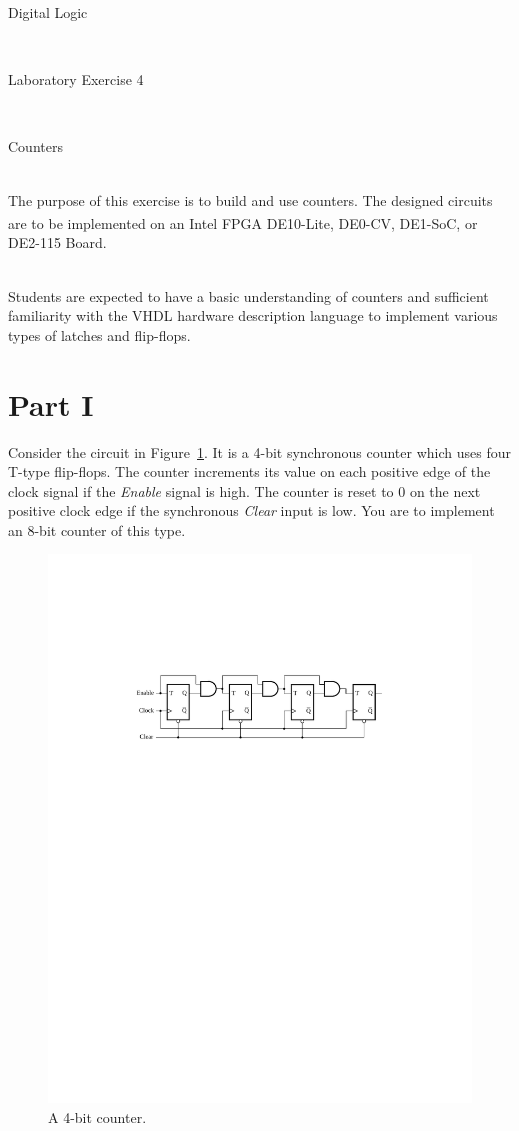 \documentclass[epsfig,10pt,fullpage]{article}
\newcommand{\LabNum}{4}
\begin{document}
\centerline{\huge Digital Logic}
~\\
\centerline{\huge Laboratory Exercise \LabNum}
~\\
\centerline{\large Counters}
~\\

The purpose of this exercise is to build and use counters. The designed circuits are to be
implemented on an Intel\textsuperscript{\textregistered} FPGA DE10-Lite, DE0-CV, DE1-SoC, or DE2-115 Board.

~\\
Students are expected to have a basic understanding of counters and sufficient familiarity
with the VHDL hardware description language to implement various types of latches and flip-flops.

\section*{Part I}
Consider the circuit in Figure~\ref{fig:asynchronous_counter}. It is a 4-bit synchronous 
counter which uses four
T-type flip-flops. The counter increments its value on each positive edge of the clock signal
if the {\it Enable} signal is high. The counter is reset to 0 on the next positive
clock edge if the synchronous {\it Clear} input is low.
You are to implement an 8-bit counter of this type.

\begin{figure}[H]
	\begin{center}
		\includegraphics[]{figures/figure1.pdf}
	\end{center}
\caption{A 4-bit counter.}
\label{fig:asynchronous_counter}
\end{figure}
\end{document}

